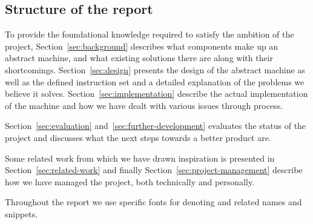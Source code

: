 \subsection{Structure of the report}

To provide the foundational knowledge required to satisfy the ambition of the
project, Section~\ref{sec:background} describes what components make up an
abstract machine, and what existing solutions there are along with their
shortcomings. Section~\ref{sec:design} presents the design of the abstract
machine as well as the defined instruction set and a detailed explanation of the
problems we believe it solves. Section~\ref{sec:implementation} describe the
actual implementation of the machine and how we have dealt with various issues
through process.

Section~\ref{sec:evaluation} and~\ref{sec:further-development} evaluates
the status of the project and discusses what the next steps towards a better
product are.

Some related work from which we have drawn inspiration is presented in
Section~\ref{sec:related-work} and finally Section~\ref{sec:project-management}
describe how we have managed the project, both technically and personally.

Throughout the report we use specific fonts for denoting  and
 related names and snippets.
